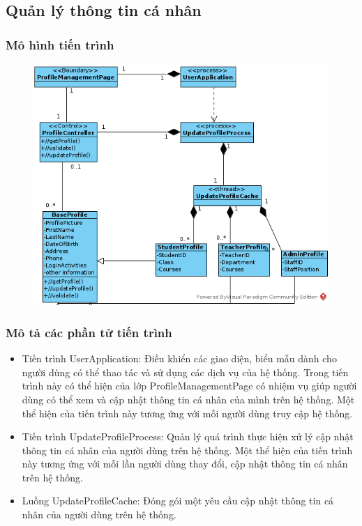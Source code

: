 \documentclass[./../main.tex]{subfiles}
\begin{document}
\subsection{Quản lý thông tin cá nhân}

\subsubsection{Mô hình tiến trình}

\begin{figure}[H]
	\centering
	\includegraphics[width=\linewidth]{./images/pv_ProfileManagement.png}
\end{figure}

\subsubsection{Mô tả các phần tử tiến trình}
\begin{itemize}
	\item Tiến trình UserApplication: Điều khiển các giao diện, biểu mẫu dành cho người dùng có thể thao tác và sử dụng các dịch vụ của hệ thống. Trong tiến trình này có  thể hiện của lớp ProfileManagementPage có nhiệm vụ giúp người dùng có thể xem và cập nhật thông tin cá nhân của mình trên hệ thống.
	      Một thể hiện của tiến trình này tương ứng với mỗi người dùng truy cập hệ thống.
	\item Tiến trình UpdateProfileProcess: Quản lý quá trình thực hiện xử lý cập nhật thông tin cá nhân của người dùng trên hệ thống.
	      Một thể hiện của tiến trình này tương ứng với mỗi lần người dùng thay đổi, cập nhật thông tin cá nhân trên hệ thống.
	\item Luồng UpdateProfileCache: Đóng gói một yêu cầu cập nhật thông tin cá nhân của người dùng trên hệ thống.
\end{itemize}
\end{document}
